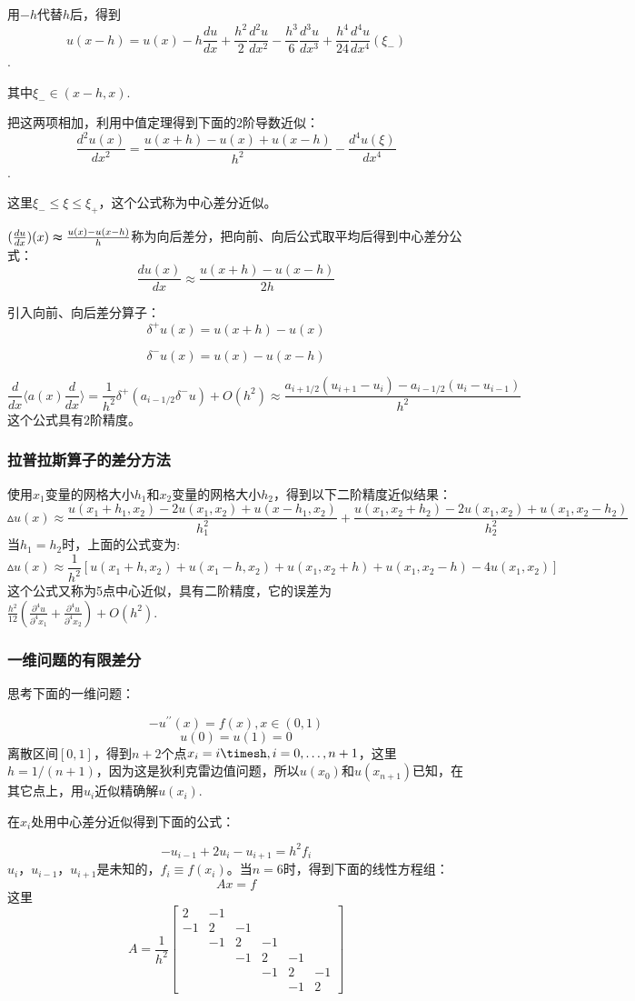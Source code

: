 \documentclass{article}
\begin{document}
用$-h$代替$h$后，得到
$$u(x-h)=u(x)-h\frac{du}{dx}+\frac{h^2}{2}\frac{d^2u}{dx^2}-\frac{h^3}{6}\frac{d^3u}{dx^3}+\frac{h^4}{24}\frac{d^4u}{dx^4}(\xi _-)$$.

其中$\xi _- \in (x-h,x)$.

把这两项相加，利用中值定理得到下面的$2$阶导数近似：
$$\frac{d^2u(x)}{dx^2}=\frac{u(x+h)-u(x)+u(x-h)}{h^2}-\frac{d^4u(\xi)}{dx^4}$$.

这里$\xi _-\le\xi\le\xi_+$，这个公式称为中心差分近似。

$(\frac{du}{dx})(x)\thickapprox \frac{u(x)-u(x-h)}{h}$称为向后差分，把向前、向后公式取平均后得到中心差分公式：
$$\frac{du(x)}{dx}\approx\frac{u(x+h)-u(x-h)}{2h}$$

引入向前、向后差分算子：
$$\delta ^+ u(x)=u(x+h)-u(x)$$

$$\delta ^- u(x)=u(x)-u(x-h)$$

$$\frac{d}{dx}\langle a(x)\frac{d}{dx}\rangle=\frac{1}{h^2}\delta ^+(a_{i-1/2}\delta ^- u)+O(h^2)\approx\frac{a_{i+1/2}(u_{i+1}-u_i)-a_{i-1/2}(u_{i}-u_{i-1})}{h^2}$$
这个公式具有$2$阶精度。

\subsubsection{拉普拉斯算子的差分方法}
使用$x_1$变量的网格大小$h_1$和$x_2$变量的网格大小$h_2$，得到以下二阶精度近似结果：
$$\vartriangle u(x)\approx\frac{u(x_1+h_1,x_2)-2u(x_1,x_2)+u(x-h_1,x_2)}{h^2 _1}+\frac{u(x_1,x_2+h_2)-2u(x_1,x_2)+u(x_1,x_2-h_2)}{h^2 _2}$$
当$h_1=h_2$时，上面的公式变为:
$$\vartriangle u(x)\approx\frac{1}{h^2}[u(x_1+h,x_2)+u(x_1-h,x_2)+u(x_1,x_2+h)+u(x_1,x_2-h)-4u(x_1,x_2)]$$
这个公式又称为5点中心近似，具有二阶精度，它的误差为$\frac{h^2}{12}(\frac{\partial^4 u}{\partial^4 x_1}+\frac{\partial^4 u}{\partial^4 x_2})+O(h^2)$.

\subsubsection{一维问题的有限差分}
思考下面的一维问题：

$$-u^{\prime\prime}(x)=f(x),x\in(0,1)$$
$$u(0)=u(1)=0$$
离散区间$[0,1]$，得到$n+2$个点$x_i=i\timesh,i=0,\ldots ,n+1$，这里$h=1/(n+1)$，因为这是狄利克雷边值问题，所以$u(x_0)$和$u(x_{n+1})$已知，在其它点上，用$u_i$近似精确解$u(x_i)$.

在$x_i$处用中心差分近似得到下面的公式：

$$-u_{i-1}+2u_i-u_{i+1}=h^2f_{i}$$
$u_i$，$u_{i-1}$，$u_{i+1}$是未知的，$f_i\equiv f(x_i)$。当$n=6$时，得到下面的线性方程组：
$$Ax=f$$
这里$$A=\frac{1}{h^2}\begin{bmatrix}
2 & {-1}\\
-1 & 2 & {-1}\\
 & {-1} & 2 & {-1}\\
 &  & {-1} & 2 & {-1}\\
 &  &  & {-1} & 2 & {-1}\\
 &  &  &  & {-1} & 2 
\end{bmatrix}$$
\end{document}
